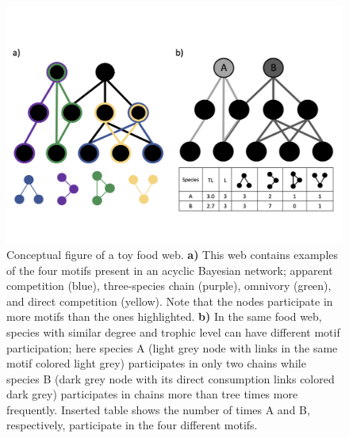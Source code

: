 \documentclass[12pt]{article}
\begin{document}
\begin{spacing}{2.0}
    \begin{figure}[hb!]
        \centering
        \includegraphics[width=1.0\textwidth]{manuscript/figures/concept_motifs_ab.png}
        \caption{Conceptual figure of a toy food web. \textbf{a)} This web contains examples of the four motifs present in an acyclic Bayesian network; apparent competition (blue), three-species chain (purple), omnivory (green), and direct competition (yellow). Note that the nodes participate in more motifs than the ones highlighted. \textbf{b)} In the same food web, species with similar degree and trophic level can have different motif participation; here species A (light grey node with links in the same motif colored light grey) participates in only two chains while species B (dark grey node with its direct consumption links colored dark grey) participates in chains more than tree times more frequently. Inserted table shows the number of times A and B, respectively, participate in the four different motifs.}
    \label{fig:concept}
    \end{figure}



\end{spacing}
\end{document}
